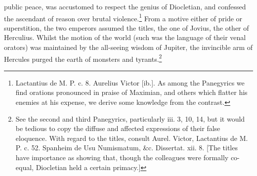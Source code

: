 public peace, was accustomed to respect the genius of Diocletian, and confessed the ascendant of reason over brutal violence.\footnote{Lactantius de M. P. c. 8. Aurelius Victor [ib.]. As among the Panegyrics we find orations pronounced in praise of Maximian, and others which flatter his enemies at his expense, we derive some knowledge from the contrast.} From a motive either of pride or superstition, the two emperors assumed the titles, the one of Jovius, the other of Herculius. Whilst the motion of the world (such was the language of their venal orators) was maintained by the all-seeing wisdom of Jupiter, the invincible arm of Hercules purged the earth of monsters and tyrants.\footnote{See the second and third Panegyrics, particularly iii. 3, 10, 14, but it would be tedious to copy the diffuse and affected expressions of their false eloquence. With regard to the titles, consult Aurel. Victor, Lactantius de M. P. c. 52. Spanheim de Usu Numismatum, \&c. Dissertat. xii. 8. [The titles have importance as showing that, though the colleagues were formally co-equal, Diocletian held a certain primacy.]}

